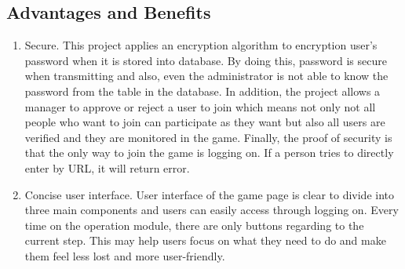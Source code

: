 \subsection{Advantages and Benefits}
\begin{enumerate}
\item Secure. This project applies an encryption algorithm to encryption user's password when it is stored into database. By doing this, password is secure when transmitting and also, even the administrator is not able to know the password from the table in the database. In addition, the project allows a manager to approve or reject a user to join which means not only not all people who want to join can participate as they want but also all users are verified and they are monitored in the game. Finally, the proof of security is that the only way to join the game is logging on. If a person tries to directly enter by URL, it will return error. 
\item Concise user interface. User interface of the game page is clear to divide into three main components and users can easily access through logging on. Every time on the operation module, there are only buttons regarding to the current step. This may help users focus on what they need to do and make them feel less lost and more user-friendly.
\end{enumerate}
